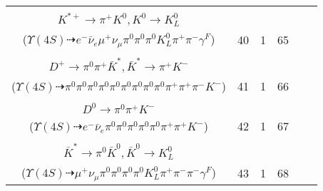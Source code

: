 \documentclass[landscape]{article}
\newcounter{rownumbers}
\newcommand\rn{\stepcounter{rownumbers}\arabic{rownumbers}}
\newcommand{\EOLP}{\\ \hline} %
\newcommand{\topoTags}[1]{#1} %
\begin{document}
\begin{longtable}{clcccc}
\rn & \makecell[l]{ $ 
\Upsilon(4S) \rightarrow B^{0} \bar{B}^{0} ,
B^{0} \rightarrow \mu^{+} \nu_{\mu} D^{*-} ,
\bar{B}^{0} \rightarrow \pi^{0} D^{0} ,
D^{*-} \rightarrow \pi^{-} \bar{D}^{0} ,
D^{0} \rightarrow \pi^{0} \pi^{0} ,
\bar{D}^{0} \rightarrow e^{-} \bar{\nu}_{e} K^{*+} \gamma^{F} ,
$ \\ $
K^{*+} \rightarrow \pi^{+} K^{0} ,
K^{0} \rightarrow K_{L}^{0} 
$ \\ ($
\Upsilon(4S) \dashrightarrow e^{-} \bar{\nu}_{e} \mu^{+} \nu_{\mu} \pi^{0} \pi^{0} \pi^{0} K_{L}^{0} \pi^{+} \pi^{-} \gamma^{F} 
$) } & \topoTags{40 & }1 & 65 \EOLP

\rn & \makecell[l]{ $ 
\Upsilon(4S) \rightarrow \bar{B}^{0} \bar{B}^{0} ,
\bar{B}^{0} \rightarrow \pi^{0} D^{0} ,
\bar{B}^{0} \rightarrow \pi^{0} \rho^{-} \eta D^{+} ,
D^{0} \rightarrow \pi^{0} \pi^{0} ,
\rho^{-} \rightarrow \pi^{0} \pi^{-} ,
\eta \rightarrow \pi^{0} \pi^{0} \pi^{0} ,
$ \\ $
D^{+} \rightarrow \pi^{0} \pi^{+} \bar{K}^{*} ,
\bar{K}^{*} \rightarrow \pi^{+} K^{-} 
$ \\ ($
\Upsilon(4S) \dashrightarrow \pi^{0} \pi^{0} \pi^{0} \pi^{0} \pi^{0} \pi^{0} \pi^{0} \pi^{0} \pi^{0} \pi^{+} \pi^{+} \pi^{-} K^{-} 
$) } & \topoTags{41 & }1 & 66 \EOLP

\rn & \makecell[l]{ $ 
\Upsilon(4S) \rightarrow B^{0} \bar{B}^{0} ,
B^{0} \rightarrow \pi^{0} \bar{D}^{0} ,
\bar{B}^{0} \rightarrow e^{-} \bar{\nu}_{e} D_{1}^{\prime+} ,
\bar{D}^{0} \rightarrow \pi^{0} \pi^{0} ,
D_{1}^{\prime+} \rightarrow \pi^{0} D^{*+} ,
D^{*+} \rightarrow \pi^{+} D^{0} ,
$ \\ $
D^{0} \rightarrow \pi^{0} \pi^{+} K^{-} 
$ \\ ($
\Upsilon(4S) \dashrightarrow e^{-} \bar{\nu}_{e} \pi^{0} \pi^{0} \pi^{0} \pi^{0} \pi^{0} \pi^{+} \pi^{+} K^{-} 
$) } & \topoTags{42 & }1 & 67 \EOLP

\rn & \makecell[l]{ $ 
\Upsilon(4S) \rightarrow \bar{B}^{0} \bar{B}^{0} ,
\bar{B}^{0} \rightarrow \pi^{0} D^{0} ,
\bar{B}^{0} \rightarrow D^{+} a_{1}^{-} ,
D^{0} \rightarrow \pi^{0} \pi^{0} ,
D^{+} \rightarrow \mu^{+} \nu_{\mu} \bar{K}^{*} ,
a_{1}^{-} \rightarrow \pi^{+} \pi^{-} \pi^{-} \gamma^{F} ,
$ \\ $
\bar{K}^{*} \rightarrow \pi^{0} \bar{K}^{0} ,
\bar{K}^{0} \rightarrow K_{L}^{0} 
$ \\ ($
\Upsilon(4S) \dashrightarrow \mu^{+} \nu_{\mu} \pi^{0} \pi^{0} \pi^{0} \pi^{0} K_{L}^{0} \pi^{+} \pi^{-} \pi^{-} \gamma^{F} 
$) } & \topoTags{43 & }1 & 68 \EOLP


\end{longtable}
\end{document}
